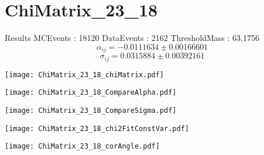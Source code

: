 \documentclass[a4paper,12pt]{article}
\begin{document}
\section{ChiMatrix\_23\_18}
\begin{minipage}{0.49\linewidth} Results \newline
MCEvents : 18120\newline
DataEvents : 2162 \newline
ThresholdMass : 63.1756\\
$$\alpha_{ij} = -0.0111634\pm 0.00166601$$
$$\sigma_{ij} = 0.0315884\pm 0.00392161$$
\end{minipage}\hfill
\begin{minipage}{0.49\linewidth} 
\texttt{[image: ChiMatrix\_23\_18\_chiMatrix.pdf]}\\
\end{minipage}
\hfill
\begin{minipage}{0.49\linewidth} 
\texttt{[image: ChiMatrix\_23\_18\_CompareAlpha.pdf]}\\
\end{minipage}
\hfill
\begin{minipage}{0.49\linewidth} 
\texttt{[image: ChiMatrix\_23\_18\_CompareSigma.pdf]}\\
\end{minipage}
\begin{minipage}{0.49\linewidth} 
\texttt{[image: ChiMatrix\_23\_18\_chi2FitConstVar.pdf]}\\
\end{minipage}
\hfill
\begin{minipage}{0.49\linewidth} 
\texttt{[image: ChiMatrix\_23\_18\_corAngle.pdf]}\\
\end{minipage}
\end{document}
